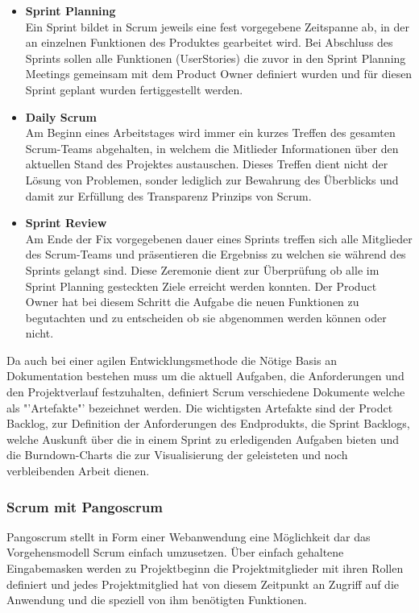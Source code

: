 \begin{itemize}
\item \textbf{Sprint Planning}\\
Ein Sprint bildet in Scrum jeweils eine fest vorgegebene Zeitspanne ab, in der an einzelnen Funktionen des Produktes gearbeitet wird. Bei Abschluss des Sprints sollen alle Funktionen (UserStories) die zuvor in den Sprint Planning Meetings gemeinsam mit dem Product Owner definiert wurden und für diesen Sprint geplant wurden fertiggestellt werden.
\item \textbf{Daily Scrum}\\
Am Beginn eines Arbeitstages wird immer ein kurzes Treffen des gesamten Scrum-Teams abgehalten, in welchem die Mitlieder Informationen über den aktuellen Stand des Projektes austauschen. Dieses Treffen dient nicht der Lösung von Problemen, sonder lediglich zur Bewahrung des Überblicks und damit zur Erfüllung des Transparenz Prinzips von Scrum.
\item \textbf{Sprint Review}\\
Am Ende der Fix vorgegebenen dauer eines Sprints treffen sich alle Mitglieder des Scrum-Teams und präsentieren die Ergebniss zu welchen sie während des Sprints gelangt sind. Diese Zeremonie dient zur Überprüfung ob alle im Sprint Planning gesteckten Ziele erreicht werden konnten. Der Product Owner hat bei diesem Schritt die Aufgabe die neuen Funktionen zu begutachten und zu entscheiden ob sie abgenommen werden können oder nicht.
\end{itemize}

Da auch bei einer agilen Entwicklungsmethode die Nötige Basis an Dokumentation bestehen muss um die aktuell Aufgaben, die Anforderungen und den Projektverlauf festzuhalten, definiert Scrum verschiedene Dokumente welche als "'Artefakte"' bezeichnet werden. Die wichtigsten Artefakte sind der Prodct Backlog, zur Definition der Anforderungen des Endprodukts, die Sprint Backlogs, welche Auskunft über die in einem Sprint zu erledigenden Aufgaben bieten und die Burndown-Charts die zur Visualisierung der geleisteten und noch verbleibenden Arbeit dienen.

\subsubsection{Scrum mit Pangoscrum}
Pangoscrum stellt in Form einer Webanwendung eine Möglichkeit dar das Vorgehensmodell Scrum einfach umzusetzen. Über einfach gehaltene Eingabemasken werden zu Projektbeginn die Projektmitglieder mit ihren Rollen definiert und jedes Projektmitglied hat von diesem Zeitpunkt an Zugriff auf die Anwendung und die speziell von ihm benötigten Funktionen.

